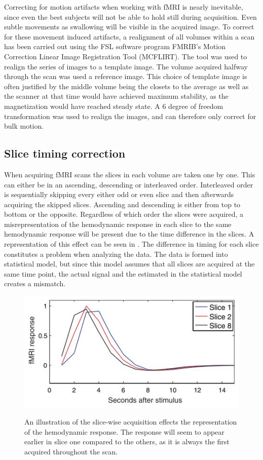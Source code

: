 Correcting for motion artifacts when working with fMRI is nearly inevitable, since even the best subjects will not be able to hold still during acquisition. Even subtle movements as swallowing will be visible in the acquired image. \cite{Poldrack2011} To correct for these movement induced artifacts, a realignment of all volumes within a scan has been carried out using the FSL software program FMRIB's Motion Correction Linear Image Registration Tool (MCFLIRT). \cite{Jenkinson2002}
The tool was used to realign the series of images to a template image. The volume acquired halfway through the scan was used a reference image. This choice of template image is often justified by the middle volume being the closets to the average as well as the scanner at that time would have achieved maximum stability, as the magnetization would have reached steady state. \cite{Poldrack2011} A 6 degree of freedom transformation was used to realign the images, and can therefore only correct for bulk motion. \cite{Jenkinson2002}




\subsection{Slice timing correction}

When acquiring fMRI scans the slices in each volume are taken one by one. This can either be in an ascending, descending or interleaved order. Interleaved order is sequentially skipping every either odd or even slice and then afterwards acquiring the skipped slices. Ascending and descending is either from top to bottom or the opposite. Regardless of which order the slices were acquired, a misrepresentation of the hemodynamic response in each slice to the same hemodynamic response will be present due to the time difference in the slices. A representation of this effect can be seen in . The difference in timing for each slice constitutes a problem when analyzing the data. The data is formed into statistical model, but since this model assumes that all slices are acquired at the same time point, the actual signal and the estimated in the statistical model creates a mismatch. \cite{Poldrack2011} \\

\begin{figure}[H] 
	{\includegraphics[width=.65\textwidth]{figures/aBackground/response}}  
	\caption{An illustration of the slice-wise acquisition effects the representation of the hemodynamic response. The response will seem to appear earlier in slice one compared to the others, as it is always the first acquired throughout the scan. \cite{Poldrack2011}}
	\label{fig:meth:slice}
\end{figure}

